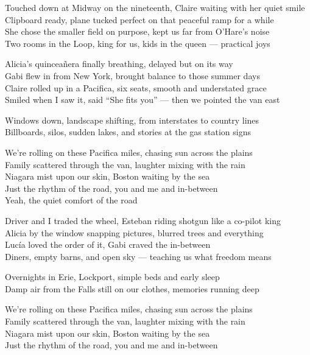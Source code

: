 \begin{lyrics}

Touched down at Midway on the nineteenth, Claire waiting with her quiet smile\\
Clipboard ready, plane tucked perfect on that peaceful ramp for a while\\
She chose the smaller field on purpose, kept us far from O’Hare’s noise\\
Two rooms in the Loop, king for us, kids in the queen — practical joys

Alicia’s quinceañera finally breathing, delayed but on its way\\
Gabi flew in from New York, brought balance to those summer days\\
Claire rolled up in a Pacifica, six seats, smooth and understated grace\\
Smiled when I saw it, said “She fits you” — then we pointed the van east

Windows down, landscape shifting, from interstates to country lines\\
Billboards, silos, sudden lakes, and stories at the gas station signs

We’re rolling on these Pacifica miles, chasing sun across the plains\\
Family scattered through the van, laughter mixing with the rain\\
Niagara mist upon our skin, Boston waiting by the sea\\
Just the rhythm of the road, you and me and in-between\\
Yeah, the quiet comfort of the road

Driver and I traded the wheel, Esteban riding shotgun like a co-pilot king\\
Alicia by the window snapping pictures, blurred trees and everything\\
Lucía loved the order of it, Gabi craved the in-between\\
Diners, empty barns, and open sky — teaching us what freedom means

Overnights in Erie, Lockport, simple beds and early sleep\\
Damp air from the Falls still on our clothes, memories running deep

We’re rolling on these Pacifica miles, chasing sun across the plains\\
Family scattered through the van, laughter mixing with the rain\\
Niagara mist upon our skin, Boston waiting by the sea\\
Just the rhythm of the road, you and me and in-between


\end{lyrics}
